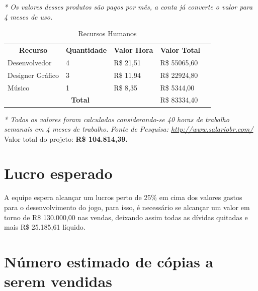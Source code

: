 \documentclass[11pt]{article} %
\begin{document}
\textit{* Os valores desses produtos são pagos por mês, a conta já converte o valor para 4 meses de uso.}
\newpage

\begin{table}[h]
\begin{tabular}{|l|l|l|l|l}
\cline{1-4}
\multicolumn{1}{|c|}{\textbf{Recurso}} & \multicolumn{1}{c|}{\textbf{Quantidade}} & \multicolumn{1}{c|}{\textbf{Valor Hora}} & \multicolumn{1}{c|}{\textbf{Valor Total}} &  \\ \cline{1-4}
Desenvolvedor                           & 4                                        & R\$ 21,51                                & R\$ 55065,60                              &  \\ \cline{1-4}
Designer Gráfico                        & 3                                        & R\$ 11,94                                & R\$ 22924,80                              &  \\ \cline{1-4}
Músico                                  & 1                                        & R\$ 8,35                                 & R\$ 5344,00                               &  \\ \cline{1-4}
\multicolumn{3}{|c|}{\textbf{Total}}                                                                                          & R\$ 83334,40                              &  \\ \cline{1-4}
\end{tabular}
\caption {Recursos Humanos}
\end{table}

\textit{* Todos os valores foram calculados considerando-se 40 horas de trabalho semanais em 4 meses de trabalho.}
\textit{Fonte de Pesquisa: \url{http://www.salariobr.com/}}
\\

Valor total do projeto: {\textbf{R\$ 104.814,39.}}

\section{Lucro esperado}

A equipe espera alcançar um lucros perto de 25\% em cima dos valores gastos para o desenvolvimento do jogo, para isso, é necessário se alcançar um valor em torno de R\$ 130.000,00 nas vendas, deixando assim todas as dívidas quitadas e mais R\$ 25.185,61 líquido.

\section{Número estimado de cópias a serem vendidas}
\end{document}
